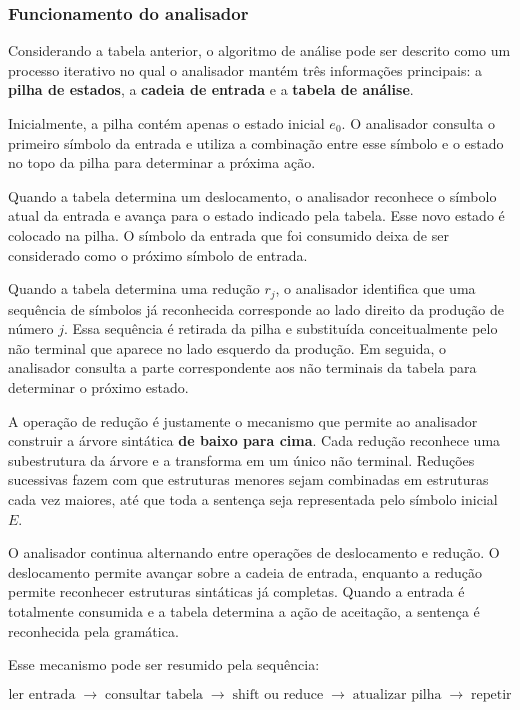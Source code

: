 \documentclass[
  brazilian,
  letterpaper,
]{book}
\theoremstyle{plain}
\theoremstyle{definition}
\theoremstyle{remark}
\begin{document}
\subsubsection{Funcionamento do
analisador}\label{funcionamento-do-analisador}

Considerando a tabela anterior, o algoritmo de análise pode ser descrito
como um processo iterativo no qual o analisador mantém três informações
principais: a \textbf{pilha de estados}, a \textbf{cadeia de entrada} e
a \textbf{tabela de análise}.

Inicialmente, a pilha contém apenas o estado inicial \(e_0\). O
analisador consulta o primeiro símbolo da entrada e utiliza a combinação
entre esse símbolo e o estado no topo da pilha para determinar a próxima
ação.

Quando a tabela determina um deslocamento, o analisador reconhece o
símbolo atual da entrada e avança para o estado indicado pela tabela.
Esse novo estado é colocado na pilha. O símbolo da entrada que foi
consumido deixa de ser considerado como o próximo símbolo de entrada.

Quando a tabela determina uma redução \(r_j\), o analisador identifica
que uma sequência de símbolos já reconhecida corresponde ao lado direito
da produção de número \(j\). Essa sequência é retirada da pilha e
substituída conceitualmente pelo não terminal que aparece no lado
esquerdo da produção. Em seguida, o analisador consulta a parte
correspondente aos não terminais da tabela para determinar o próximo
estado.

A operação de redução é justamente o mecanismo que permite ao analisador
construir a árvore sintática \textbf{de baixo para cima}. Cada redução
reconhece uma subestrutura da árvore e a transforma em um único não
terminal. Reduções sucessivas fazem com que estruturas menores sejam
combinadas em estruturas cada vez maiores, até que toda a sentença seja
representada pelo símbolo inicial \(E\).

O analisador continua alternando entre operações de deslocamento e
redução. O deslocamento permite avançar sobre a cadeia de entrada,
enquanto a redução permite reconhecer estruturas sintáticas já
completas. Quando a entrada é totalmente consumida e a tabela determina
a ação de aceitação, a sentença é reconhecida pela gramática.

Esse mecanismo pode ser resumido pela sequência:

\[
\boxed{
\text{ler entrada}
\;\longrightarrow\;
\text{consultar tabela}
\;\longrightarrow\;
\text{shift ou reduce}
\;\longrightarrow\;
\text{atualizar pilha}
\;\longrightarrow\;
\text{repetir}
}
\]
\end{document}

